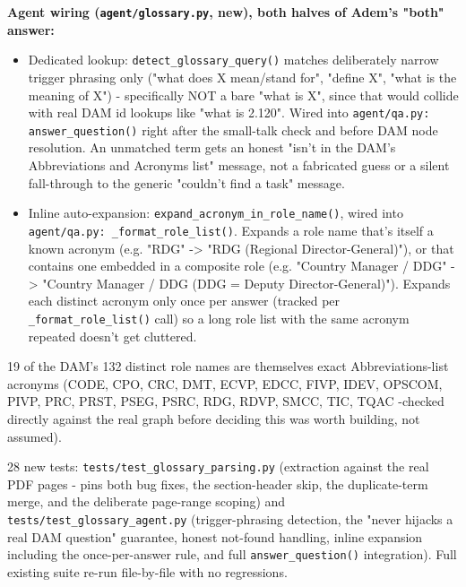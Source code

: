 \textbf{Agent wiring (\texttt{agent/\allowbreak{}glossary.py}, new), both halves of Adem's "both" answer:}

\begin{itemize}
\item Dedicated lookup: \texttt{detect\_\allowbreak{}glossary\_\allowbreak{}query()} matches deliberately narrow trigger phrasing only ("what does X mean/stand for", "define X", "what is the meaning of X") - specifically NOT a bare "what is X", since that would collide with real DAM id lookups like "what is 2.120". Wired into \texttt{agent/\allowbreak{}qa.py: answer\_\allowbreak{}question()} right after the small-talk check and before DAM node resolution. An unmatched term gets an honest "isn't in the DAM's Abbreviations and Acronyms list" message, not a fabricated guess or a silent fall-through to the generic "couldn't find a task" message.
\item Inline auto-expansion: \texttt{expand\_\allowbreak{}acronym\_\allowbreak{}in\_\allowbreak{}role\_\allowbreak{}name()}, wired into \texttt{agent/\allowbreak{}qa.py: \_\allowbreak{}format\_\allowbreak{}role\_\allowbreak{}list()}. Expands a role name that's itself a known acronym (e.g. "RDG" -> "RDG (Regional Director-General)"), or that contains one embedded in a composite role (e.g. "Country Manager / DDG" -> "Country Manager / DDG (DDG = Deputy Director-General)"). Expands each distinct acronym only once per answer (tracked per \texttt{\_\allowbreak{}format\_\allowbreak{}role\_\allowbreak{}list()} call) so a long role list with the same acronym repeated doesn't get cluttered.
\end{itemize}
19 of the DAM's 132 distinct role names are themselves exact Abbreviations-list acronyms (CODE, CPO, CRC, DMT, ECVP, EDCC, FIVP, IDEV, OPSCOM, PIVP, PRC, PRST, PSEG, PSRC, RDG, RDVP, SMCC, TIC, TQAC -checked directly against the real graph before deciding this was worth building, not assumed).

28 new tests: \texttt{tests/\allowbreak{}test\_\allowbreak{}glossary\_\allowbreak{}parsing.py} (extraction against the real PDF pages - pins both bug fixes, the section-header skip, the duplicate-term merge, and the deliberate page-range scoping) and \texttt{tests/\allowbreak{}test\_\allowbreak{}glossary\_\allowbreak{}agent.py} (trigger-phrasing detection, the "never hijacks a real DAM question" guarantee, honest not-found handling, inline expansion including the once-per-answer rule, and full \texttt{answer\_\allowbreak{}question()} integration). Full existing suite re-run file-by-file with no regressions.

